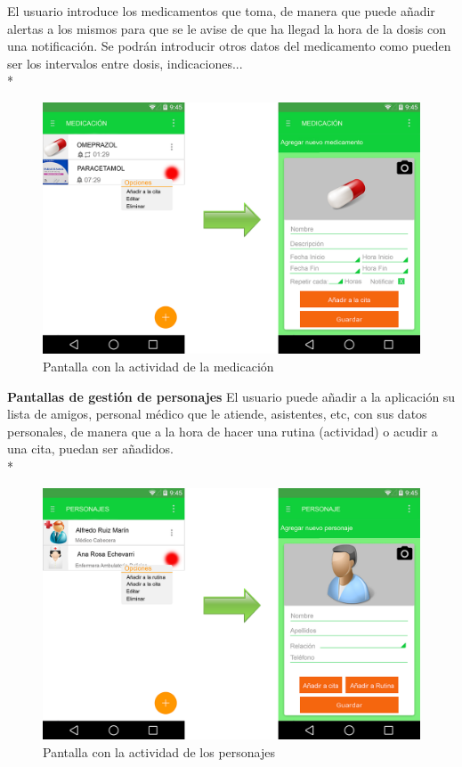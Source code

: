 \documentclass[../pfc.tex]{subfiles}
\begin{document}
		
		El usuario introduce los medicamentos que toma, de manera que puede añadir alertas a los mismos para que se le avise de que ha llegad la hora de la dosis con una notificación.
		Se podrán introducir otros datos del medicamento como pueden ser los intervalos entre dosis, indicaciones...\\*
		
		\begin{figure}[H]
			\centering
			\includegraphics[width=0.7\linewidth]{../images/medicacion}
			\caption{Pantalla con la actividad de la medicación}
			\label{fig:medicacion}
		\end{figure}
		
		
		\textbf{Pantallas de gestión de personajes}
		El usuario puede añadir a la aplicación su lista de amigos, personal médico que le atiende, asistentes, etc, con sus datos personales, de manera que a la hora de hacer una rutina (actividad) o acudir a una cita, puedan ser añadidos.\\*
		
		
		\begin{figure}[H]
			\centering
			\includegraphics[width=0.7\linewidth]{../images/personajes}
			\caption{Pantalla con la actividad de los personajes}
			\label{fig:personajes}
		\end{figure}
		
\end{document}
